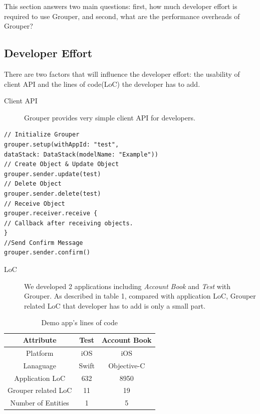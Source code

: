 \documentclass[twocolumn,10pt]{article}
\begin{document}
This section answers two main questions:  first, how much developer effort is required to use Grouper, and second, what are the performance overheads of Grouper?

\subsection{Developer Effort}

There are two factors that will influence the developer effort: the usability of client API and the lines of code(LoC) the developer has to add.

\begin{description}
	\item[Client API] Grouper provides very simple client API for developers.
\end{description}

\begin{lstlisting}
// Initialize Grouper
grouper.setup(withAppId: "test",
dataStack: DataStack(modelName: "Example")) 
// Create Object & Update Object
grouper.sender.update(test)
// Delete Object
grouper.sender.delete(test)
// Receive Object
grouper.receiver.receive { 
// Callback after receiving objects.
}
//Send Confirm Message
grouper.sender.confirm()
\end{lstlisting}

\begin{description}
	\item[LoC] We developed 2 applications including \emph{Account Book} and \emph{Test} with Grouper. As described in table 1, compared with application LoC, Grouper related LoC that developer has to add is only a small part. 
\end{description}

\begin{table}[!htb]
	\centering
	\caption{Demo app's lines of code}
	\label{my-label}
	\begin{tabular}{c|c|c}
		\hline
		Attribute           & Test  & Account Book \\ \hline
		Platform            & iOS   & iOS          \\ \hline
		Lanaguage           & Swift & Objective-C  \\ \hline
		Application LoC     & 632   & 8950         \\ \hline
		Grouper related LoC & 11    & 19           \\ \hline
		Number of Entities  & 1     & 5            \\ \hline
	\end{tabular}
\end{table}
\end{document}
